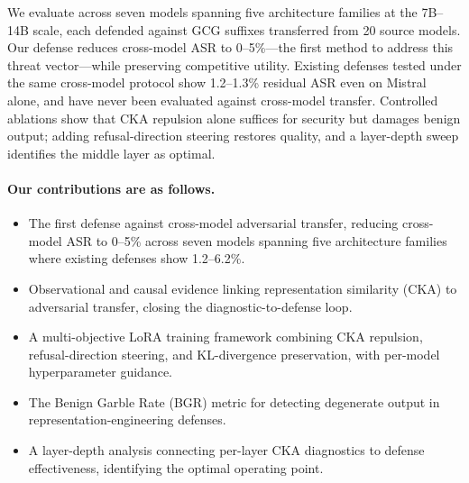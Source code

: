 We evaluate across seven models spanning five architecture families at the 7B--14B scale, each defended against GCG suffixes transferred from 20 source models.
Our defense reduces cross-model ASR to 0--5\%---the first method to address this threat vector---while preserving competitive utility.
Existing defenses tested under the same cross-model protocol show 1.2--1.3\% residual ASR even on Mistral alone, and have never been evaluated against cross-model transfer.
Controlled ablations show that CKA repulsion alone suffices for security but damages benign output; adding refusal-direction steering restores quality, and a layer-depth sweep identifies the middle layer as optimal.

\paragraph{Our contributions are as follows.}
\begin{itemize}[noitemsep]
    \item The first defense against cross-model adversarial transfer, reducing cross-model ASR to 0--5\% across seven models spanning five architecture families where existing defenses show 1.2--6.2\%.
    \item Observational and causal evidence linking representation similarity (CKA) to adversarial transfer, closing the diagnostic-to-defense loop.
    \item A multi-objective LoRA training framework combining CKA repulsion, refusal-direction steering, and KL-divergence preservation, with per-model hyperparameter guidance.
    \item The Benign Garble Rate (BGR) metric for detecting degenerate output in representation-engineering defenses.
    \item A layer-depth analysis connecting per-layer CKA diagnostics to defense effectiveness, identifying the optimal operating point.
\end{itemize}
